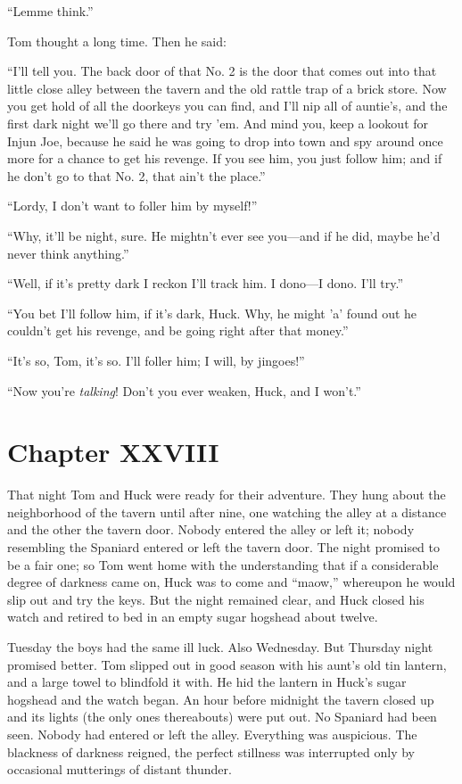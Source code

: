 \documentclass{book}
\begin{document}
“Lemme think.”

Tom thought a long time. Then he said:

“I’ll tell you. The back door of that No. 2 is the door that comes out into that little close alley between the tavern and the old rattle trap of a brick store. Now you get hold of all the doorkeys you can find, and I’ll nip all of auntie’s, and the first dark night we’ll go there and try ’em. And mind you, keep a lookout for Injun Joe, because he said he was going to drop into town and spy around once more for a chance to get his revenge. If you see him, you just follow him; and if he don’t go to that No. 2, that ain’t the place.”

“Lordy, I don’t want to foller him by myself!”

“Why, it’ll be night, sure. He mightn’t ever see you—and if he did, maybe he’d never think anything.”

“Well, if it’s pretty dark I reckon I’ll track him. I dono—I dono. I’ll try.”

“You bet I’ll follow him, if it’s dark, Huck. Why, he might ’a’ found out he couldn’t get his revenge, and be going right after that money.”

“It’s so, Tom, it’s so. I’ll foller him; I will, by jingoes!”

“Now you’re \emph{talking}! Don’t you ever weaken, Huck, and I won’t.”

\chapter*{Chapter XXVIII}

That night Tom and Huck were ready for their adventure. They hung about the neighborhood of the tavern until after nine, one watching the alley at a distance and the other the tavern door. Nobody entered the alley or left it; nobody resembling the Spaniard entered or left the tavern door. The night promised to be a fair one; so Tom went home with the understanding that if a considerable degree of darkness came on, Huck was to come and “maow,” whereupon he would slip out and try the keys. But the night remained clear, and Huck closed his watch and retired to bed in an empty sugar hogshead about twelve.

Tuesday the boys had the same ill luck. Also Wednesday. But Thursday night promised better. Tom slipped out in good season with his aunt’s old tin lantern, and a large towel to blindfold it with. He hid the lantern in Huck’s sugar hogshead and the watch began. An hour before midnight the tavern closed up and its lights (the only ones thereabouts) were put out. No Spaniard had been seen. Nobody had entered or left the alley. Everything was auspicious. The blackness of darkness reigned, the perfect stillness was interrupted only by occasional mutterings of distant thunder.
\end{document}

